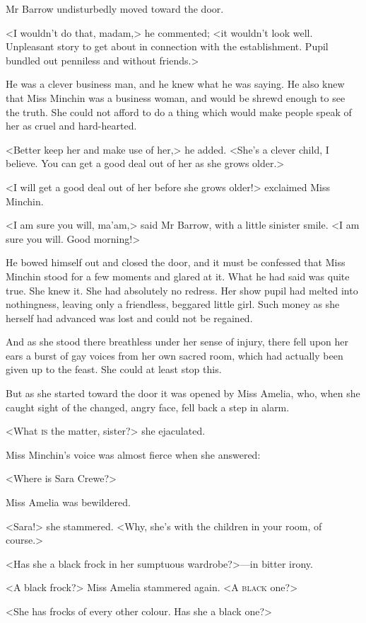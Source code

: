 Mr Barrow undisturbedly moved toward the door.

<I wouldn't do that, madam,> he commented; <it wouldn't look well. Unpleasant story to get about in connection with the establishment. Pupil bundled out penniless and without friends.>

He was a clever business man, and he knew what he was saying. He also knew that Miss Minchin was a business woman, and would be shrewd enough to see the truth. She could not afford to do a thing which would make people speak of her as cruel and hard-hearted.

<Better keep her and make use of her,> he added. <She's a clever child, I believe. You can get a good deal out of her as she grows older.>

<I will get a good deal out of her before she grows older!> exclaimed Miss Minchin.

<I am sure you will, ma'am,> said Mr Barrow, with a little sinister smile. <I am sure you will. Good morning!>

He bowed himself out and closed the door, and it must be confessed that Miss Minchin stood for a few moments and glared at it. What he had said was quite true. She knew it. She had absolutely no redress. Her show pupil had melted into nothingness, leaving only a friendless, beggared little girl. Such money as she herself had advanced was lost and could not be regained.

And as she stood there breathless under her sense of injury, there fell upon her ears a burst of gay voices from her own sacred room, which had actually been given up to the feast. She could at least stop this.

But as she started toward the door it was opened by Miss Amelia, who, when she caught sight of the changed, angry face, fell back a step in alarm.

<What \textsc{is} the matter, sister?> she ejaculated.

Miss Minchin's voice was almost fierce when she answered:

<Where is Sara Crewe?>

Miss Amelia was bewildered.

<Sara!> she stammered. <Why, she's with the children in your room, of course.>

<Has she a black frock in her sumptuous wardrobe?>—in bitter irony.

<A black frock?> Miss Amelia stammered again. <A \textsc{black} one?>

<She has frocks of every other colour. Has she a black one?>

